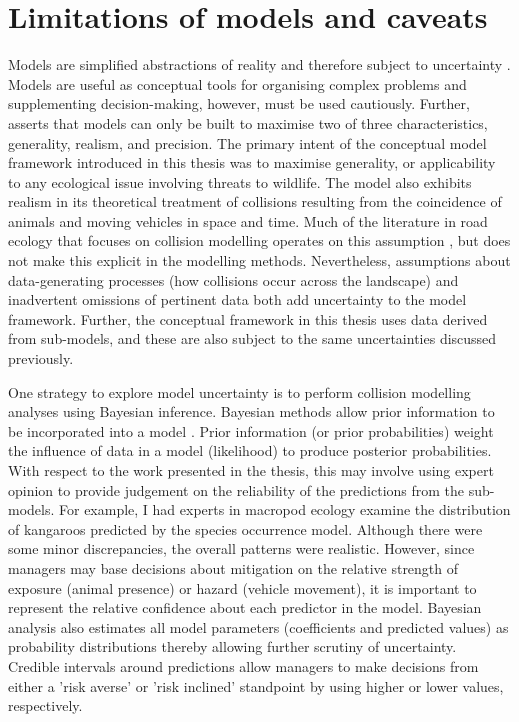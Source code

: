 \section{Limitations of models and caveats}

Models are simplified abstractions of reality and therefore subject to uncertainty \citep{burg05}. Models are useful as conceptual tools for organising complex problems and supplementing decision-making, however, must be used cautiously. Further, \cite{levi66} asserts that models can only be built to maximise two of three characteristics, generality, realism, and precision. The primary intent of the conceptual model framework introduced in this thesis was to maximise generality, or applicability to any ecological issue involving threats to wildlife. The model also exhibits realism in its theoretical treatment of collisions resulting from the coincidence of animals and moving vehicles in space and time. Much of the literature in road ecology that focuses on collision modelling operates on this assumption \citep{form03,guns11}, but does not make this explicit in the modelling methods. Nevertheless, assumptions about data-generating processes (how collisions occur across the landscape) and inadvertent omissions of pertinent data both add uncertainty to the model framework. Further, the conceptual framework in this thesis uses data derived from sub-models, and these are also subject to the same uncertainties discussed previously.  

One strategy to explore model uncertainty is to perform collision modelling analyses using Bayesian inference. Bayesian methods allow prior information to be incorporated into a model \citep{mcca07}. Prior information (or prior probabilities) weight the influence of data in a model (likelihood) to produce posterior probabilities. With respect to the work presented in the thesis, this may involve using expert opinion to provide judgement on the reliability of the predictions from the sub-models. For example, I had experts in macropod ecology examine the distribution of kangaroos predicted by the species occurrence model. Although there were some minor discrepancies, the overall patterns were realistic. However, since managers may base decisions about mitigation on the relative strength of exposure (animal presence) or hazard (vehicle movement), it is important to represent the relative confidence about each predictor in the model. Bayesian analysis also estimates all model parameters (coefficients and predicted values) as probability distributions thereby allowing further scrutiny of uncertainty. Credible intervals around predictions allow managers to make decisions from either a 'risk averse' or 'risk inclined' standpoint by using higher or lower values, respectively. 


